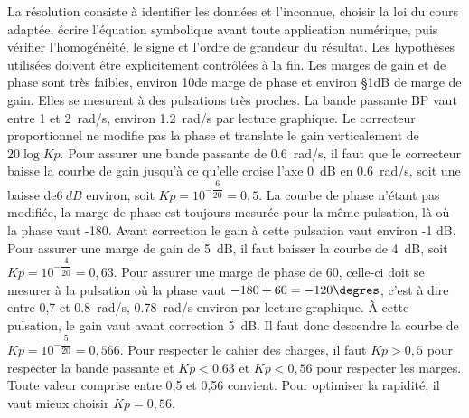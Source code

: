 \begin{corrigebox}[Corrigé]
La résolution consiste à identifier les données et l'inconnue, choisir la loi du cours adaptée, écrire l'équation symbolique avant toute application numérique, puis vérifier l'homogénéité, le signe et l'ordre de grandeur du résultat. Les hypothèses utilisées doivent être explicitement contrôlées à la fin.
Les marges de gain et de phase sont très faibles, environ 10\degres de marge de phase et
environ \S{1}{dB} de marge de gain. Elles se
mesurent à des pulsations très proches.
La bande passante BP vaut entre 1 et \SI{2}{rad/s},
environ \SI{1,2}{rad/s} par lecture graphique.
Le correcteur proportionnel ne modifie pas la phase et translate le gain verticalement de
$20 \log Kp$. Pour assurer une bande passante de \SI{0,6}{rad/s}, il faut que le correcteur baisse la
courbe de gain jusqu'à ce qu'elle croise l'axe \SI{0}{dB} en \SI{0,6}{rad/s}, soit une baisse de$\SI{6}{dB}$
environ, soit $Kp=10^{-\dfrac{6}{20}}=0,5$.
La courbe de phase n'étant pas modifiée, la marge de phase est toujours mesurée pour la
même pulsation, là où la phase vaut -180\degres. Avant correction le gain à cette pulsation vaut
environ -1 dB. Pour assurer une marge de gain de \SI{5}{dB}, il faut baisser la courbe de \SI{4}{dB},
soit $Kp=10^{-\dfrac{4}{20}}=0,63$.
Pour assurer une marge de phase de 60\degres, celle-ci doit se mesurer à la pulsation où la phase
vaut $-180+60=-120\degres$, c'est à dire entre 0,7 et \SI{0,8}{rad/s}, \SI{0,78}{rad/s} environ par lecture
graphique. À cette pulsation, le gain vaut avant correction \SI{5}{dB}. Il faut donc descendre la
courbe de $Kp=10^{-\dfrac{5}{20}}=0,566$.
Pour respecter le cahier des charges, il faut $Kp > 0,5$ pour respecter la bande passante et
$Kp<0.63$ et $Kp<0,56$ pour respecter les marges. Toute valeur comprise entre 0,5 et 0,56
convient. Pour optimiser la rapidité, il vaut mieux choisir $Kp=0,56$.
\end{corrigebox}
